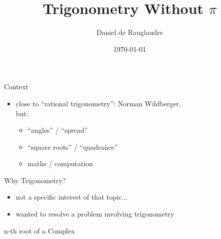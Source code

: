\documentclass{beamer}
\title{Trigonometry Without $\pi$}
\author{Daniel de Rauglaudre}
\date{\today}
\begin{document}
\begin{frame}
    \titlepage
\end{frame}

\begin{frame}{}
\end{frame}

\begin{frame}{Context}
  \begin{itemize}
    \item close to ``rational trigonometry'':  Norman Wildberger,\\ but:
      \begin{itemize}
      \item ``angles'' / ``spread''
      \item ``square roots'' / ``quadrance''
      \item maths / computation
      \end{itemize}
  \end{itemize}
\end{frame}

\begin{frame}{Why Trigonometry?}
  \begin{itemize}
  \item not a specific interest of that topic...
  \item wanted to resolve a problem involving trigonometry
  \end{itemize}
\end{frame}

\begin{frame}{n-th root of a Complex}
\end{frame}
\end{document}
